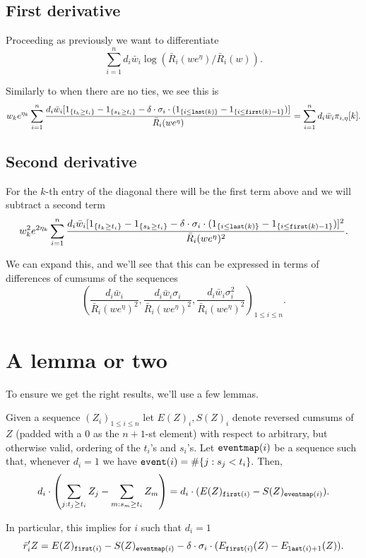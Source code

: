 \documentclass{article}
\begin{document}
\subsection{First derivative}

Proceeding as previously we want to differentiate
$$
\sum_{i=1}^n d_i \bar{w}_i \log \left( \bar{R}_i(we^{\eta})  / \bar{R}_i(w) \right).
$$

Similarly to  when there are no ties, we see this is
$$
w_k e^{\eta_k}\sum_{i=1}^n \frac{d_i \bar{w}_i [1_{\{t_k \geq t_i\}} - 1_{\{s_k \geq t_i\}} - \delta \cdot \sigma_i \cdot( 1_{\{i \leq {\tt last}(k)\}} - 1_{\{i \leq {\tt first}(k)-1\}}) ]}{\bar{R}_i(we^{\eta})} = \sum_{i=1}^n d_i \bar{w}_i
\pi_{i,\eta}[k].
$$


\subsection{Second derivative}

For the $k$-th entry of the diagonal
there will be the first term above 
 and we will subtract a second term
$$
w^2_k e^{2\eta_k}\sum_{i=1}^n \frac{d_i \bar{w}_i [1_{\{t_k \geq t_i\}} - 1_{\{s_k \geq t_i\}} - \delta \cdot \sigma_i\cdot( 1_{\{i \leq {\tt last}(k)\}} - 1_{\{i \leq {\tt first}(k)-1\}})]^2}{\bar{R}_i(we^{\eta})^2}.
$$

We can expand this, and we'll see that this can be expressed in terms of differences of cumsums of the sequences
$$
\left(\frac{d_i \bar{w}_i}{\bar{R}_i(we^{\eta})^2}, \frac{d_i \bar{w}_i \sigma_i}{\bar{R}_i(we^{\eta})^2}, \frac{d_i \bar{w}_i \sigma^2_i}{\bar{R}_i(we^{\eta})^2}\right)_{1 \leq i \leq n}.
$$

\section{A lemma or two}

To ensure we get the right results, we'll use a few lemmas.

\begin{lemma}
\label{lem:forward}
    Given a sequence $(Z_i)_{1 \leq i \leq n}$ let $E(Z)_i, S(Z)_i$ denote
    reversed cumsums of $Z$ (padded with a 0 as the $n+1$-st element) with respect to arbitrary, but otherwise valid, ordering of the $t_i$'s and $s_i$'s. Let
    ${\tt eventmap}(i)$ be a sequence such that, whenever
    $d_i=1$ we have ${\tt event}(i) = \#\{j:s_j < t_i\}.$
    Then, 
    $$
   d_i \cdot \left( \sum_{j: t_j \geq t_i} Z_j - \sum_{m: s_m \geq t_i} Z_m \right) = d_i  \cdot (E(Z)_{{\tt first}(i)} - S(Z)_{{\tt eventmap}(i)}).$$

   In particular, this implies for $i$ such that $d_i=1$
   $$
   \bar{r}_i'Z = E(Z)_{{\tt first}(i)} - S(Z)_{{\tt eventmap}(i)} - \delta \cdot \sigma_i  \cdot (E_{{\tt first}(i)}(Z) - E_{{\tt last}(i)+1}(Z)).
   $$
   
\end{lemma}
\end{document}
